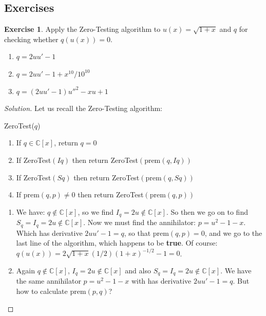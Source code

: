 \documentclass{article}
\theoremstyle{definition}
\newtheorem*{exer*}{Exercise}
\newcommand{\C}{\mathbb{C}}
\begin{document}
\subsection{Exercises}
\begin{exer*}
    Apply the Zero-Testing algorithm to $u(x)=\sqrt{1+x}$ and $q$ for checking whether $q(u(x))=0$.
    \begin{enumerate}[label=\alph*)]
        \item $q=2uu'-1$
        \item $q=2uu'-1+x^{10}/10^{10}$
        \item $q=(2uu'-1)u''^2-xu+1$
    \end{enumerate}
\end{exer*}
\begin{proof}[Solution]
    Let us recall the Zero-Testing algorithm:
    \begin{algorithm}[H]
\caption{ZeroTest($q$)}
	

 		\begin{enumerate}
 		    \item If $q \in \mathbb{C}[x]$, return $q = 0$
\item If ZeroTest$(Iq)$ then return ZeroTest$(\text{prem}(q,Iq))$
\item If ZeroTest$(Sq)$ then return ZeroTest$(\text{prem}(q,Sq))$
\item If $\text{prem}(q, p) \neq 0$ then return ZeroTest$(\text{prem}(q, p))$
 		\end{enumerate}
	\;
\end{algorithm}
\begin{enumerate}[label=\alph*)]
    \item We have: $q \not\in\C[x]$, so we find $I_q=2u\not\in\C[x]$. So then we go on to find $S_q=I_q=2u\not\in\C[x]$. Now we must find the annihilator: $p=u^2-1-x$. Which has derivative $2uu'-1=q$, so that $\text{prem}(q,p)=0$, and we go to the last line of the algorithm, which happens to be \textbf{true}. Of course: $q(u(x))=2\sqrt{1+x}(1/2)(1+x)^{-1/2}-1=0$.
    \item Again $q \not\in\C[x]$, $I_q=2u\not\in\C[x]$ and also $S_q=I_q=2u\not\in\C[x]$. We have the same annihilator $p=u^2-1-x$ with has derivative $2uu'-1=q$. But how to calculate $\text{prem}(p,q)$?
\end{enumerate}
\end{proof}
\newpage
\end{document}
